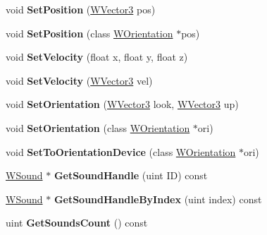 \begin{DoxyCompactItemize}
\item 
void {\bfseries Set\+Position} (\hyperlink{class_w_vector3}{W\+Vector3} pos)\hypertarget{class_w_sound_component_aeae8a306576686d9d27dd2176206bdbc}{}\label{class_w_sound_component_aeae8a306576686d9d27dd2176206bdbc}

\item 
void {\bfseries Set\+Position} (class \hyperlink{class_w_orientation}{W\+Orientation} $\ast$pos)\hypertarget{class_w_sound_component_ad8f6c04be0aa46bb612b0af2e2d93f7c}{}\label{class_w_sound_component_ad8f6c04be0aa46bb612b0af2e2d93f7c}

\item 
void {\bfseries Set\+Velocity} (float x, float y, float z)\hypertarget{class_w_sound_component_a9f45b7bd22fde6c942b2b112d4780fe1}{}\label{class_w_sound_component_a9f45b7bd22fde6c942b2b112d4780fe1}

\item 
void {\bfseries Set\+Velocity} (\hyperlink{class_w_vector3}{W\+Vector3} vel)\hypertarget{class_w_sound_component_ac903271f38734814fd97ee2fa919f588}{}\label{class_w_sound_component_ac903271f38734814fd97ee2fa919f588}

\item 
void {\bfseries Set\+Orientation} (\hyperlink{class_w_vector3}{W\+Vector3} look, \hyperlink{class_w_vector3}{W\+Vector3} up)\hypertarget{class_w_sound_component_ad8192dc015e90ccb689460d15e0d525a}{}\label{class_w_sound_component_ad8192dc015e90ccb689460d15e0d525a}

\item 
void {\bfseries Set\+Orientation} (class \hyperlink{class_w_orientation}{W\+Orientation} $\ast$ori)\hypertarget{class_w_sound_component_aa32f5e392d5dab5864a1a8e2e4a24f5e}{}\label{class_w_sound_component_aa32f5e392d5dab5864a1a8e2e4a24f5e}

\item 
void {\bfseries Set\+To\+Orientation\+Device} (class \hyperlink{class_w_orientation}{W\+Orientation} $\ast$ori)\hypertarget{class_w_sound_component_acc21eafb25e9d3bf716b9dd932f114c8}{}\label{class_w_sound_component_acc21eafb25e9d3bf716b9dd932f114c8}

\item 
\hyperlink{class_w_sound}{W\+Sound} $\ast$ {\bfseries Get\+Sound\+Handle} (uint ID) const \hypertarget{class_w_sound_component_a8c35fb5bb1db5fb7a4175b78c018ef71}{}\label{class_w_sound_component_a8c35fb5bb1db5fb7a4175b78c018ef71}

\item 
\hyperlink{class_w_sound}{W\+Sound} $\ast$ {\bfseries Get\+Sound\+Handle\+By\+Index} (uint index) const \hypertarget{class_w_sound_component_a84970950490e4f6758af43096dab7cd7}{}\label{class_w_sound_component_a84970950490e4f6758af43096dab7cd7}

\item 
uint {\bfseries Get\+Sounds\+Count} () const \hypertarget{class_w_sound_component_a27b657e0d4c58b33aa823386f9f0674b}{}\label{class_w_sound_component_a27b657e0d4c58b33aa823386f9f0674b}

\end{DoxyCompactItemize}
